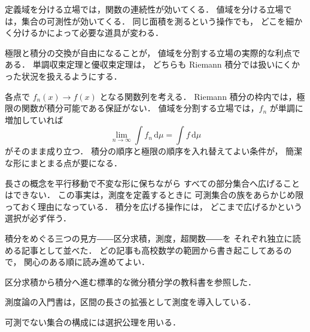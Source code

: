 \documentclass[lualatex,paper=b5j,fontsize=10pt,twoside]{jlreq}
\begin{document}
\begin{mkinsert}
定義域を分ける立場では，関数の連続性が効いてくる．
値域を分ける立場では，集合の可測性が効いてくる．
同じ面積を測るという操作でも，
どこを細かく分けるかによって必要な道具が変わる．
\end{mkinsert}

極限と積分の交換が自由になることが，
値域を分割する立場の実際的な利点である．
単調収束定理と優収束定理は，
どちらも Riemann 積分では扱いにくかった状況を扱えるようにする．


各点で $f_n(x)\to f(x)$ となる関数列を考える．
Riemann 積分の枠内では，極限の関数が積分可能である保証がない．
値域を分割する立場では，$f_n$ が単調に増加していれば
\begin{equation}
  \lim_{n\to\infty}\int f_n\,\mathrm{d}\mu=\int f\,\mathrm{d}\mu
\end{equation}
がそのまま成り立つ．
積分の順序と極限の順序を入れ替えてよい条件が，
簡潔な形にまとまる点が要になる．


長さの概念を平行移動で不変な形に保ちながら
すべての部分集合へ広げることはできない．
この事実は，測度を定義するときに
可測集合の族をあらかじめ限っておく理由になっている．
積分を広げる操作には，
どこまで広げるかという選択が必ず伴う．

\begin{mkfullinsert}[b]
積分をめぐる三つの見方――区分求積，測度，超関数――を
それぞれ独立に読める記事として並べた．
どの記事も高校数学の範囲から書き起こしてあるので，
関心のある順に読み進めてよい．
\end{mkfullinsert}

\begin{mkreferences}
  \item 区分求積から積分へ進む標準的な微分積分学の教科書を参照した．
  \item 測度論の入門書は，区間の長さの拡張として測度を導入している．
  \item 可測でない集合の構成には選択公理を用いる．
\end{mkreferences}

\MKByline
\end{document}

